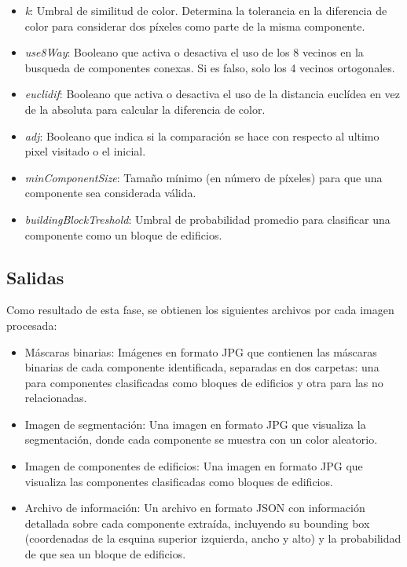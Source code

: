 \documentclass[twocolumn, fontsize=10pt]{article}
\begin{document}
\begin{itemize}
    \item \textit{k}: Umbral de similitud de color. Determina la tolerancia en la diferencia de color para considerar dos píxeles como parte de la misma componente.
    \item \textit{use8Way}: Booleano que activa o desactiva el uso de los 8 vecinos en la busqueda de componentes conexas. Si es falso, solo los 4 vecinos ortogonales.
    \item \textit{euclidif}: Booleano que activa o desactiva el uso de la distancia euclídea en vez de la absoluta para calcular la diferencia de color.
    \item \textit{adj}: Booleano que indica si la comparación se hace con respecto al ultimo pixel visitado o el inicial.
    \item \textit{minComponentSize}: Tamaño mínimo (en número de píxeles) para que una componente sea considerada válida.
    \item \textit{buildingBlockTreshold}: Umbral de probabilidad promedio para clasificar una componente como un bloque de edificios.
\end{itemize}

\subsection{Salidas}
Como resultado de esta fase, se obtienen los siguientes archivos por cada imagen procesada:

\begin{itemize}
    \item Máscaras binarias: Imágenes en formato JPG que contienen las máscaras binarias de cada componente identificada, separadas en dos carpetas: una para componentes clasificadas como bloques de edificios y otra para las no relacionadas.
    \item Imagen de segmentación: Una imagen en formato JPG que visualiza la segmentación, donde cada componente se muestra con un color aleatorio.
        \item Imagen de componentes de edificios: Una imagen en formato JPG que visualiza las componentes clasificadas como bloques de edificios.
    \item Archivo de información: Un archivo en formato JSON con información detallada sobre cada componente extraída, incluyendo su bounding box (coordenadas de la esquina superior izquierda, ancho y alto) y la probabilidad de que sea un bloque de edificios.
\end{itemize}
\end{document}
